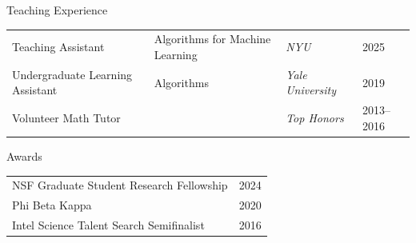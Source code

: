 \documentclass{resume} %
\begin{document}

\begin{rSection}{Teaching Experience}

\begin{tabular}{ll>{\em}ll}
    Teaching Assistant & Algorithms for Machine Learning &  NYU & 2025 \\
    Undergraduate Learning Assistant & Algorithms &   Yale University & 2019 \\
    Volunteer Math Tutor && Top Honors & 2013--2016
\end{tabular}

\end{rSection}


\begin{rSection}{Awards}

\begin{tabular}{ll}
    NSF Graduate Student Research Fellowship & 2024 \\
    Phi Beta Kappa & 2020 \\
    Intel Science Talent Search Semifinalist & 2016 
\end{tabular}

\end{rSection}
\end{document}

